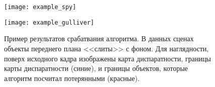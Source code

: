 \begin{figure}[!h]
	\begin{minipage}[b]{1.0\linewidth}
		\centering
		\centerline{ \texttt{[image: example\_spy]} }
	\end{minipage}
	\begin{minipage}[b]{1.0\linewidth}
		\centering
		\centerline{ \texttt{[image: example\_gulliver]} }
	\end{minipage}
    \caption{Пример результатов срабатвания алгоритма. В данных сценах
    	объекты переднего плана <<слиты>> с фоном. Для наглядности,
    	поверх исходного кадра изображены карта диспаратности, границы
    	карты диспаратности (синие), и границы объектов, которые алгоритм посчитал
    	потерянными (красные).}
	\label{fig:res_example}
\end{figure}
